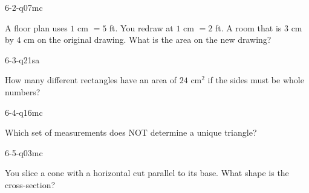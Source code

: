 \begin{practiceQuestion}{6-2-q07}{mc}
\begin{questionText}
A floor plan uses $1$ cm $= 5$ ft. You redraw at $1$ cm $= 2$ ft. A room that is $3$ cm by $4$ cm on the original drawing. What is the area on the new drawing?
\end{questionText}
\end{practiceQuestion}

\begin{practiceQuestion}{6-3-q21}{sa}
\begin{questionText}
How many different rectangles have an area of $24$ cm$^2$ if the sides must be whole numbers?
\end{questionText}
\end{practiceQuestion}

\begin{practiceQuestion}{6-4-q16}{mc}
\begin{questionText}
Which set of measurements does NOT determine a unique triangle?
\end{questionText}
\end{practiceQuestion}

\begin{practiceQuestion}{6-5-q03}{mc}
\begin{questionText}
You slice a cone with a horizontal cut parallel to its base. What shape is the cross-section?
\end{questionText}
\end{practiceQuestion}

